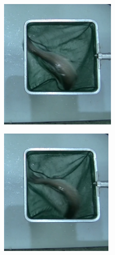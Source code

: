 \begin{enumerate}
\begin{figure}[H]
\begin{subfigure}[b]{\textwidth}
\begin{subfigure}[b]{0.25\textwidth}
                    \includegraphics[width=0.8\textwidth]{images/6/SinOptical3.png}
                    \label{fig:SinOptical3}
                \end{subfigure}
                \begin{subfigure}[b]{0.25\textwidth}
                    \centering
                    \includegraphics[width=0.78\textwidth]{images/6/SinOptical4.png}
                    \label{fig:SinOptical4}

\end{subfigure}
\end{subfigure}
\end{figure}
\end{enumerate}
